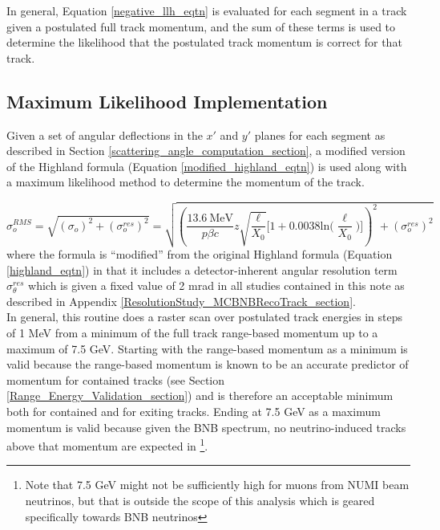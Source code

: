 In general, Equation \ref{negative_llh_eqtn} is evaluated for each segment in a track given a postulated full track momentum, and the sum of these terms is used to determine the likelihood that the postulated track momentum is correct for that track.

\subsection{Maximum Likelihood Implementation}\label{maximum_likelihood_section}

Given a set of angular deflections in the $x'$ and $y'$ planes for each segment as described in Section \ref{scattering_angle_computation_section}, a modified version of the Highland formula (Equation \ref{modified_highland_eqtn}) is used along with a maximum likelihood method to determine the momentum of the track. 

\begin{equation}\label{modified_highland_eqtn}
\sigma_{o}^{RMS} = \sqrt{ (\sigma_o)^2 + (\sigma_o^{res})^2} = \sqrt{ (\frac{13.6\  \text{MeV}}{p\beta c}z\sqrt{\frac{\ell}{X_0}}\Big[1+0.0038\text{ln}\Big(\frac{\ell}{X_0}\Big)\Big])^2 + (\sigma_o^{res})^2 }
\end{equation}
where the formula is ``modified'' from the original Highland formula (Equation \ref{highland_eqtn}) in that it includes a detector-inherent angular resolution term $\sigma_\theta^{res}$ which is given a fixed value of 2 mrad in all studies contained in this note as described in Appendix \ref{ResolutionStudy_MCBNBRecoTrack_section}\cite{leonidas2}.\\

In general, this routine does a raster scan over postulated track energies in steps of 1 MeV from a minimum of the full track range-based momentum up to a maximum of 7.5 GeV. Starting with the range-based momentum as a minimum is valid because the range-based momentum is known to be an accurate predictor of momentum for contained tracks (see Section \ref{Range_Energy_Validation_section}) and is therefore an acceptable minimum both for contained and for exiting tracks. Ending at 7.5 GeV as a maximum momentum is valid because given the BNB spectrum, no neutrino-induced tracks above that momentum are expected in {\ub}\footnote{Note that 7.5 GeV might not be sufficiently high for muons from NUMI beam neutrinos, but that is outside the scope of this analysis which is geared specifically towards BNB neutrinos}.\\

